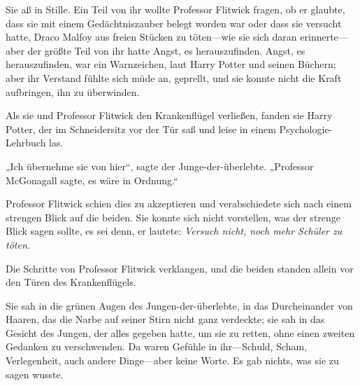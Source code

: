 Sie aß in Stille. Ein Teil von ihr wollte Professor Flitwick fragen, ob er glaubte, dass sie mit einem Gedächtniszauber belegt worden war oder dass sie versucht hatte, Draco Malfoy aus freien Stücken zu töten—wie sie sich daran erinnerte—aber der größte Teil von ihr hatte Angst, es herauszufinden. Angst, es herauszufinden, war ein Warnzeichen, laut Harry Potter und seinen Büchern; aber ihr Verstand fühlte sich müde an, geprellt, und sie konnte nicht die Kraft aufbringen, ihn zu überwinden.

Als sie und Professor Flitwick den Krankenflügel verließen, fanden sie Harry Potter, der im Schneidersitz vor der Tür saß und leise in einem Psychologie-Lehrbuch las.

„Ich übernehme sie von hier“, sagte der Junge-der-überlebte. „Professor McGonagall sagte, es wäre in Ordnung.“

Professor Flitwick schien dies zu akzeptieren und verabschiedete sich nach einem strengen Blick auf die beiden. Sie konnte sich nicht vorstellen, was der strenge Blick sagen sollte, es sei denn, er lautete: \emph{Versuch nicht, noch mehr Schüler zu töten.}

Die Schritte von Professor Flitwick verklangen, und die beiden standen allein vor den Türen des Krankenflügels.

Sie sah in die grünen Augen des Jungen-der-überlebte, in das Durcheinander von Haaren, das die Narbe auf seiner Stirn nicht ganz verdeckte; sie sah in das Gesicht des Jungen, der alles gegeben hatte, um sie zu retten, ohne einen zweiten Gedanken zu verschwenden. Da waren Gefühle in ihr—Schuld, Scham, Verlegenheit, auch andere Dinge—aber keine Worte. Es gab nichts, was sie zu sagen wusste.

